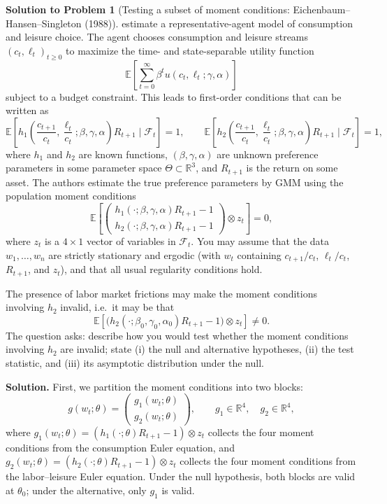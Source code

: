\documentclass[12pt]{article}
\newcommand{\R}{\mathbb R}
\newcommand{\E}{\mathbb E}
\theoremstyle{definition}
\newtheorem{solution}{Solution to Problem}
\begin{document}
\begin{solution}[Testing a subset of moment conditions: Eichenbaum--Hansen--Singleton (1988)] \citet{EichenbaumHansenSingleton1988} estimate a representative-agent model of consumption and leisure choice. The agent chooses consumption and leisure streams $(c_t,\ell_t)_{t\geq 0}$ to maximize the time- and state-separable utility function
\[
\E\left[ \sum_{t=0}^{\infty} \beta^t u(c_t,\ell_t;\gamma,\alpha) \right]
\]
subject to a budget constraint. This leads to first-order conditions that can be written as
\[
\E\left[ h_1\!\left( \frac{c_{t+1}}{c_t}, \frac{\ell_t}{c_t}; \beta, \gamma, \alpha \right) R_{t+1} \mid \mathcal{F}_t \right] = 1, \qquad
\E\left[ h_2\!\left( \frac{c_{t+1}}{c_t}, \frac{\ell_t}{c_t}; \beta, \gamma, \alpha \right) R_{t+1} \mid \mathcal{F}_t \right] = 1,
\]
where $h_1$ and $h_2$ are known functions, $(\beta,\gamma,\alpha)$ are unknown preference parameters in some parameter space $\Theta\subset\R^3$, and $R_{t+1}$ is the return on some asset. The authors estimate the true preference parameters by GMM using the population moment conditions
\[
\E\left[ \begin{pmatrix} h_1(\cdot;\beta,\gamma,\alpha) R_{t+1} - 1 \\ h_2(\cdot;\beta,\gamma,\alpha) R_{t+1} - 1 \end{pmatrix} \otimes z_t \right] = 0,
\]
where $z_t$ is a $4\times 1$ vector of variables in $\mathcal{F}_t$. You may assume that the data $w_1,\ldots,w_n$ are strictly stationary and ergodic (with $w_t$ containing $c_{t+1}/c_t$, $\ell_t/c_t$, $R_{t+1}$, and $z_t$), and that all usual regularity conditions hold.

The presence of labor market frictions may make the moment conditions involving $h_2$ invalid, i.e.\ it may be that
\[
\E\left[ \bigl( h_2(\cdot;\beta_0,\gamma_0,\alpha_0) R_{t+1} - 1 \bigr) \otimes z_t \right] \neq 0.
\]
The question asks: describe how you would test whether the moment conditions involving $h_2$ are invalid; state (i) the null and alternative hypotheses, (ii) the test statistic, and (iii) its asymptotic distribution under the null.

\bigskip

\noindent\textbf{Solution.} First, we partition the moment conditions into two blocks:
\[
g(w_t;\theta) = \begin{pmatrix} g_1(w_t;\theta) \\ g_2(w_t;\theta) \end{pmatrix}, \qquad g_1\in\R^4,\quad g_2\in\R^4,
\]
where $g_1(w_t;\theta) = (h_1(\cdot;\theta)R_{t+1}-1)\otimes z_t$ collects the four moment conditions from the consumption Euler equation, and $g_2(w_t;\theta) = (h_2(\cdot;\theta)R_{t+1}-1)\otimes z_t$ collects the four moment conditions from the labor--leisure Euler equation. Under the null hypothesis, both blocks are valid at $\theta_0$; under the alternative, only $g_1$ is valid.


\end{solution}
\end{document}
